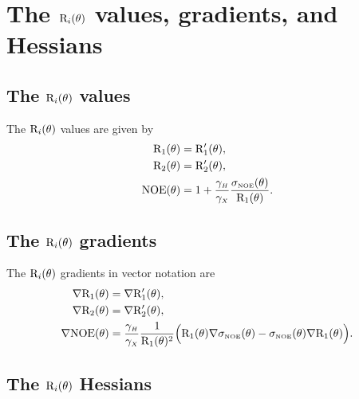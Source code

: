 \newpage
\section{The $\mathrm{R}_i(\theta)$ values, gradients, and Hessians}


\subsection{The $\mathrm{R}_i(\theta)$ values}

The $\mathrm{R}_i(\theta)$ values are given by
\begin{subequations}
\begin{align}
    \mathrm{R}_1(\theta) & = \mathrm{R}_1'(\theta), \label{eq: Ri trans: R1} \\
    \mathrm{R}_2(\theta) & = \mathrm{R}_2'(\theta), \label{eq: Ri trans: R2} \\
    \mathrm{NOE}(\theta) & = 1 + \frac{\gamma_{\scriptscriptstyle H}}{\gamma_{\scriptscriptstyle X}} \frac{\sigma_{\scriptscriptstyle \mathrm{NOE}}(\theta)}{\mathrm{R}_1(\theta)}. \label{eq: Ri trans: NOE}
\end{align}
\end{subequations}


\subsection{The $\mathrm{R}_i(\theta)$ gradients}

The $\mathrm{R}_i(\theta)$ gradients in vector notation are
\begin{subequations}
\begin{align}
    \nabla \mathrm{R}_1(\theta) & = \nabla \mathrm{R}_1'(\theta), \label{eq: Ri trans: dR1} \\
    \nabla \mathrm{R}_2(\theta) & = \nabla \mathrm{R}_2'(\theta), \label{eq: Ri trans: dR2} \\
    \nabla \mathrm{NOE}(\theta) & = \frac{\gamma_{\scriptscriptstyle H}}{\gamma_{\scriptscriptstyle X}} \frac{1}{\mathrm{R}_1(\theta)^2} \Big(
        \mathrm{R}_1(\theta) \nabla \sigma_{\scriptscriptstyle \mathrm{NOE}}(\theta) - \sigma_{\scriptscriptstyle \mathrm{NOE}}(\theta) \nabla \mathrm{R}_1(\theta)
    \Big). \label{eq: Ri trans: dNOE}
\end{align}
\end{subequations}


\subsection{The $\mathrm{R}_i(\theta)$ Hessians}


